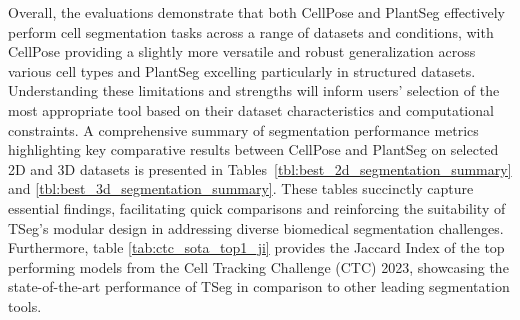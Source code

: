 \documentclass[./dissertation.tex]{subfiles}
\begin{document}
Overall, the evaluations demonstrate that both CellPose and PlantSeg effectively perform cell segmentation tasks across a range of datasets and conditions, with CellPose providing a slightly more versatile and robust generalization across various cell types and PlantSeg excelling particularly in structured datasets. Understanding these limitations and strengths will inform users' selection of the most appropriate tool based on their dataset characteristics and computational constraints. A comprehensive summary of segmentation performance metrics highlighting key comparative results between CellPose and PlantSeg on selected 2D and 3D datasets is presented in Tables~\ref{tbl:best_2d_segmentation_summary} and \ref{tbl:best_3d_segmentation_summary}. These tables succinctly capture essential findings, facilitating quick comparisons and reinforcing the suitability of TSeg's modular design in addressing diverse biomedical segmentation challenges. Furthermore, table \ref{tab:ctc_sota_top1_ji} provides the Jaccard Index of the top performing models from the Cell Tracking Challenge (CTC) 2023, showcasing the state-of-the-art performance of TSeg in comparison to other leading segmentation tools.
\end{document}
